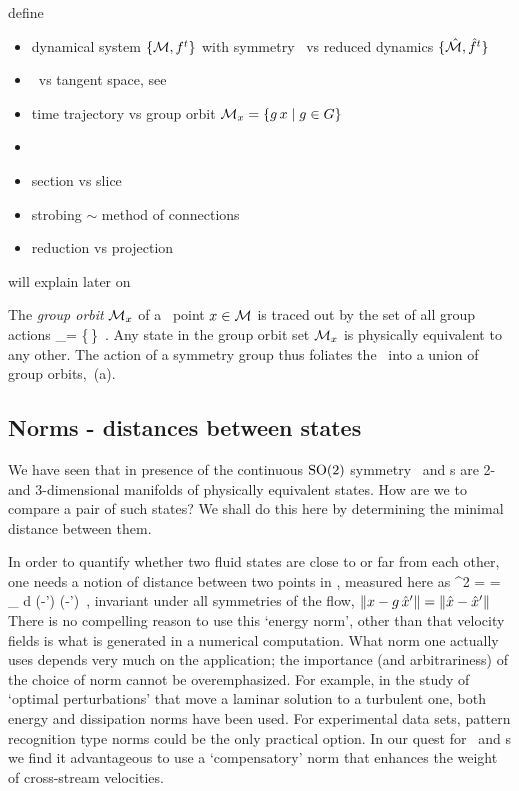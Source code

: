 define
\begin{itemize}
  \item dynamical system $\{{\cal M},f^t\}$ with symmetry \Group\
        vs reduced dynamics $\{\hat{\cal M},\hat{f}^t\}$
  \item \statesp\ vs tangent space, see 
  \item time trajectory \flowRed{\zeit}{\ssp} vs group orbit
        ${\cal M}_{x} = \{g\,x \mid g \in {\ensuremath{G}}\}$
  \item \template
  \item section {\PoincS} vs slice \pSRed
  \item strobing $\sim$ method of connections
  \item reduction vs projection
\end{itemize}
will explain later on
    \color{black}\fi

The \emph{group orbit} ${\cal M}_{x} $ of a \statesp\ point $x \in {\cal M}$ is
traced out by the set of all group actions
\beq
\pS_\ssp = \{\LieEl\,\ssp \mid \LieEl \in {\Group}\}
\,.
Any state in the  group orbit set ${\cal M}_{x}$
is physically equivalent to any other. The action of a symmetry group
thus foliates the \statesp\ into a union of group orbits,
\,{(a)}.

\subsection{Norms - distances between states}

We have seen that in presence of the continuous $\textrm{SO}(2)$ symmetry
\reqva\ and \rpo s are 2- and 3-dimensional manifolds of physically
equivalent states. How are we to compare a pair of such states? We shall
do this here by determining the minimal distance between them.

In order to quantify
whether two fluid states are close to or far from each other, one
needs a notion of distance between two points in \statesp, measured
here as
\beq
  ^2  =  =
\int_\bCell \! d \bx \;
(-\vec{u}') \cdot (-')
\,,
invariant under all symmetries of the flow,
$\|{x-g\,{\hat{x}'}}\|=\|{\hat{x}-{\hat{x}'}}\|$
There is no compelling reason to use this {`energy norm'}, other than
that velocity fields is what is generated in a numerical
computation. What norm one actually uses depends very much on the
application; the importance (and arbitrariness) of the choice of
norm cannot be overemphasized. For example, in the study of `optimal perturbations' that
move a laminar solution to a turbulent one, both energy
\citep{TeHaHe10} and dissipation \citep{LoCaCoPeGo11} norms have been
used.
For experimental data sets, pattern recognition type norms could be the
only practical option\rf{MakeThisUp}.
In our quest for \reqva\ and \rpo s we
find it advantageous to use a `compensatory' norm 
that enhances the weight of cross-stream velocities.


